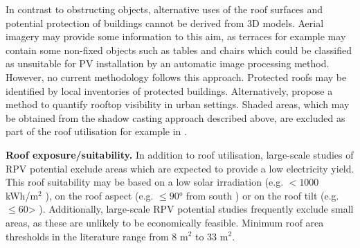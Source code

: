 In contrast to obstructing objects, alternative uses of the roof surfaces and potential protection of buildings cannot be derived from 3D models. Aerial imagery may provide some information to this aim, as terraces for example may contain some non-fixed objects such as tables and chairs which could be classified as unsuitable for PV installation by an automatic image processing method. However, no current methodology follows this approach. 
Protected roofs may be identified by local inventories of protected buildings. 
Alternatively, \citet{florio_assessing_2018} propose a method to quantify rooftop visibility in urban settings.
Shaded areas, which may be obtained from the shadow casting approach described above, are excluded as part of the roof utilisation for example in \cite{singh_estimation_2015,hong_development_2017}.

\textbf{Roof exposure/suitability.} In addition to roof utilisation, large-scale studies of RPV potential exclude areas which are expected to provide a low electricity yield. This roof suitability may be based on a low solar irradiation (e.g. $< 1000$ kWh/m$^2$ \cite{buffat_scalable_2018,portmann_sonnendach.ch:_2016,desthieux_solar_2018}), on the roof aspect (e.g. $\leq 90$° from south \cite{assouline_quantifying_2017,assouline_large-scale_2018,nguyen_incorporating_2012}) or on the roof tilt (e.g. $\leq 60$> \cite{jakubiec_method_2013}).
Additionally, large-scale RPV potential studies frequently exclude small areas, as these are unlikely to be economically feasible. Minimum roof area thresholds in the literature range from 8 m$^2$ \cite{assouline_large-scale_2018} to 33 m$^2$\cite{hong_development_2017}.

